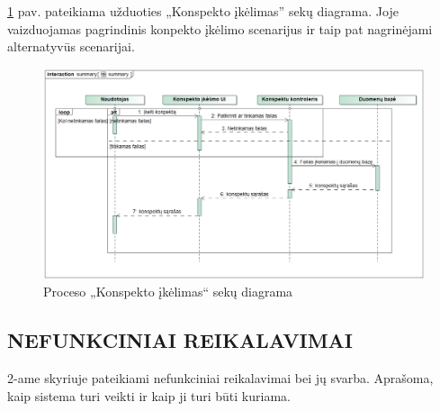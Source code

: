 \documentclass{VUMIFPSkursinis}
\begin{document}
\ref{fig:summary} pav. pateikiama užduoties „Konspekto įkėlimas” sekų diagrama. Joje vaizduojamas pagrindinis konpekto įkėlimo scenarijus ir taip pat nagrinėjami alternatyvūs scenarijai.
\begin{figure}[H]
	\centering
	\includegraphics[width=\linewidth]{img/summary.jpg}
	\caption{Proceso „Konspekto įkėlimas“ sekų diagrama}
	\label{fig:summary}
\end{figure}
\newpage

\subsection{NEFUNKCINIAI REIKALAVIMAI}
2-ame skyriuje pateikiami nefunkciniai reikalavimai bei jų svarba. Aprašoma, kaip sistema turi veikti ir kaip ji turi būti kuriama.
\end{document}
